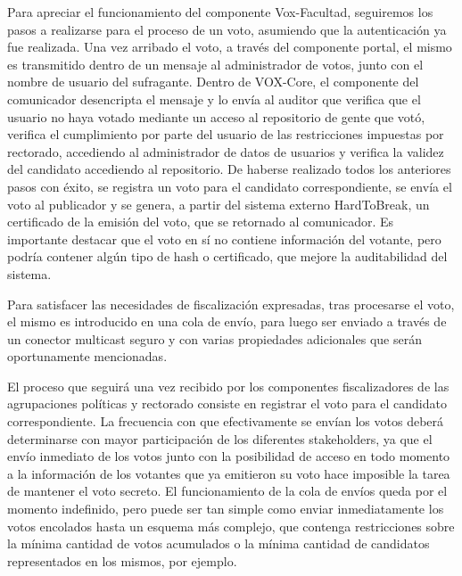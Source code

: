 Para apreciar el funcionamiento del componente Vox-Facultad, seguiremos los pasos a realizarse para el proceso de un voto, asumiendo que la autenticación ya fue realizada. Una vez arribado el voto, a través del componente portal, el mismo es transmitido dentro de un mensaje al administrador de votos, junto con el nombre de usuario del sufragante. Dentro de VOX-Core, el componente del comunicador desencripta el mensaje y lo envía al auditor que verifica que el usuario no haya votado mediante un acceso al repositorio de gente que votó, verifica el cumplimiento por parte del usuario de las restricciones impuestas por rectorado, accediendo al administrador de datos de usuarios %
y verifica la validez del candidato accediendo al repositorio. %
De haberse realizado todos los anteriores pasos con éxito, se registra un voto para el candidato correspondiente, se envía el voto al publicador y se genera, a partir del sistema externo HardToBreak, un certificado de la emisión del voto, que se retornado al comunicador. Es importante destacar que el voto en sí no contiene información del votante, pero podría contener algún tipo de hash o certificado, que mejore la auditabilidad del sistema. 
 
Para satisfacer las necesidades de fiscalización expresadas, tras procesarse el voto, el mismo es introducido en una cola de envío, %
para luego ser enviado a través de un conector multicast seguro y con varias propiedades adicionales que serán oportunamente mencionadas.

El proceso que seguirá una vez recibido por los componentes fiscalizadores de las agrupaciones políticas y rectorado consiste en registrar el voto para el candidato correspondiente. La frecuencia con que efectivamente se envían los votos deberá determinarse con mayor participación de los diferentes stakeholders, ya que el envío inmediato de los votos junto con la posibilidad de acceso en todo momento a la información de los votantes que ya emitieron su voto hace imposible la tarea de mantener el voto secreto. El funcionamiento de la cola de envíos queda por el momento indefinido, pero puede ser tan simple como enviar inmediatamente los votos encolados hasta un esquema más complejo, que contenga restricciones sobre la mínima cantidad de votos acumulados o la mínima cantidad de candidatos representados en los mismos, por ejemplo.






